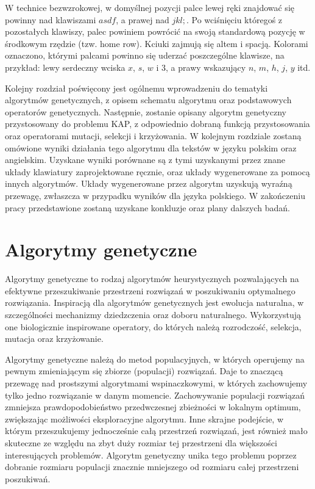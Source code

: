 \documentclass[brudnopis]{xmgr}
\begin{document}
W technice bezwzrokowej, w domyślnej pozycji palce lewej ręki znajdować się powinny nad klawiszami $asdf$, a prawej nad $jkl;$. Po wciśnięciu któregoś z pozostałych klawiszy, palec powiniem powrócić na swoją standardową pozycję w środkowym rzędzie (tzw. home row). Kciuki zajmują się altem i spacją. Kolorami oznaczono, którymi palcami powinno się uderzać poszczególne klawisze, na przykład: lewy serdeczny wciska $x$, $s$, $w$ i $3$, a prawy wskazujący $n$, $m$, $h$, $j$, $y$ itd.

Kolejny rozdział poświęcony jest ogólnemu wprowadzeniu do tematyki algorytmów genetycznych, z opisem schematu algorytmu oraz podstawowych operatorów genetycznych. Następnie, zostanie opisany algorytm genetyczny przystosowany do problemu KAP, z odpowiednio dobraną funkcją przystosowania oraz operatorami mutacji, selekcji i krzyżowania. W kolejnym rozdziale zostaną omówione wyniki działania tego algorytmu dla tekstów w języku polskim oraz angielskim. Uzyskane wyniki porównane są z tymi uzyskanymi przez znane układy klawiatury zaprojektowane ręcznie, oraz układy wygenerowane za pomocą innych algorytmów. Układy wygenerowane przez algorytm uzyskują wyraźną przewagę, zwłaszcza w przypadku wyników dla języka polskiego. W zakończeniu pracy przedstawione zostaną uzyskane konkluzje oraz plany dalszych badań.


\chapter{Algorytmy genetyczne}

Algorytmy genetyczne to rodzaj algorytmów heurystycznych pozwalających na efektywne przeszukiwanie przestrzeni rozwiązań w poszukiwaniu optymalnego rozwiązania. Inspiracją dla algorytmów genetycznych jest ewolucja naturalna, w szczególności mechanizmy dziedzczenia oraz doboru naturalnego. Wykorzystują one biologicznie inspirowane operatory, do których należą rozrodczość, selekcja, mutacja oraz krzyżowanie.

Algorytmy genetyczne należą do metod populacyjnych, w których operujemy na pewnym zmieniającym się zbiorze (populacji) rozwiązań. Daje to znaczącą przewagę nad prostszymi algorytmami wspinaczkowymi, w których zachowujemy tylko jedno rozwiązanie w danym momencie. Zachowywanie populacji rozwiązań zmniejsza prawdopodobieństwo przedwczesnej zbieżności w lokalnym optimum, zwiększając możliwości eksploracyjne algorytmu. Inne skrajne podejście, w którym przeszukujemy jednocześnie całą przestrzeń rozwiązań, jest również mało skuteczne ze względu na zbyt duży rozmiar tej przestrzeni dla większości interesujących problemów. Algorytm genetyczny unika tego problemu poprzez dobranie rozmiaru populacji znacznie mniejszego od rozmiaru całej przestrzeni poszukiwań.
\end{document}

